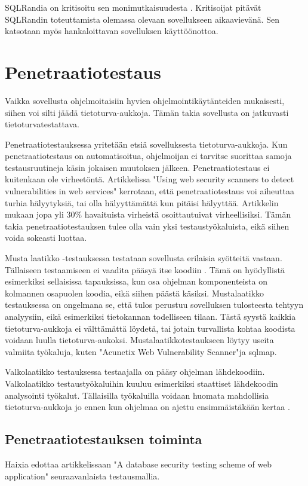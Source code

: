 \documentclass[finnish]{tktltiki2}
\theoremstyle{definition}
\theoremstyle{remark}
\begin{document}
	SQLRandia on kritisoitu sen monimutkaisuudesta \cite{prepared}. Kritisoijat pitävät SQLRandin toteuttamista olemassa olevaan sovellukseen aikaavievänä. Sen katsotaan myös hankaloittavan sovelluksen käyttöönottoa.
	\section{Penetraatiotestaus}
	
	 Vaikka sovellusta ohjelmoitaisiin hyvien ohjelmointikäytänteiden mukaisesti, siihen voi silti jäädä tietoturva-aukkoja. Tämän takia sovellusta on jatkuvasti tietoturvatestattava. 
	 
	 Penetraatiotestauksessa yritetään etsiä sovelluksesta tietoturva-aukkoja. Kun penetraatiotestaus on automatisoitua, ohjelmoijan ei tarvitse suorittaa samoja testausruutineja käsin jokaisen muutoksen jälkeen. Penetraatiotestaus ei kuitenkaan ole virheetöntä. Artikkelissa "Using web security scanners to detect vulnerabilities in web services" \cite{detection} kerrotaan, että penetraatiotestaus voi aiheuttaa turhia hälyytyksiä, tai olla hälyyttämättä kun pitäisi hälyyttää. Artikkelin mukaan jopa yli 30\% havaituista virheistä osoittautuivat virheellisiksi. Tämän takia penetraatiotestauksen tulee olla vain yksi testaustyökaluista, eikä siihen voida sokeasti luottaa.
	 
	Musta laatikko -testauksessa testataan sovellusta erilaisia syötteitä vastaan. Tällaiseen testaamiseen ei vaadita pääsyä itse koodiin \cite{testing2}. Tämä on hyödyllistä esimerkiksi sellaisissa tapauksissa, kun osa ohjelman komponenteista on kolmannen osapuolen koodia, eikä siihen päästä käsiksi. Mustalaatikko testauksessa on ongelmana se, että tulos perustuu sovelluksen tulosteesta tehtyyn analyysiin, eikä esimerkiksi tietokannan todelliseen tilaan. Tästä syystä kaikkia tietoturva-aukkoja ei välttämättä löydetä, tai jotain turvallista kohtaa koodista voidaan luulla tietoturva-aukoksi. Mustalaatikkotestaukseen löytyy useita valmiita työkaluja, kuten "Acunetix Web Vulnerability Scanner"\space ja sqlmap.
	
	Valkolaatikko testauksessa testaajalla on pääsy ohjelman lähdekoodiin. Valkolaatikko testaustyökaluihin kuuluu esimerkiksi staattiset lähdekoodin analysointi työkalut. Tällaisilla työkaluilla voidaan huomata mahdollisia tietoturva-aukkoja jo ennen kun ohjelmaa on ajettu ensimmäistäkään kertaa \cite{valkolaatikko}.
	
	\subsection{Penetraatiotestauksen toiminta}
	 Haixia edottaa artikkelissaan "A database security testing scheme of web application" \cite{testing} seuraavanlaista testausmallia.
	
\end{document}

